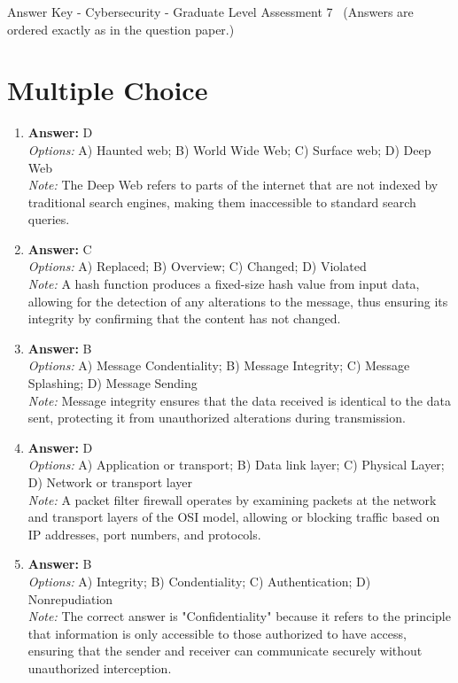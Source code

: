 \documentclass[12pt]{article}
\begin{document}
\begin{center}
Answer Key - Cybersecurity - Graduate Level Assessment 7 \
\small (Answers are ordered exactly as in the question paper.)
\end{center}

\section*{Multiple Choice}
\begin{enumerate}[label=\arabic*.]
\item \textbf{Answer:} D
\\ \textit{Options:} A) Haunted web; B) World Wide Web; C) Surface web; D) Deep Web
\\ \textit{Note:} The Deep Web refers to parts of the internet that are not indexed by traditional search engines, making them inaccessible to standard search queries.
\item \textbf{Answer:} C
\\ \textit{Options:} A) Replaced; B) Overview; C) Changed; D) Violated
\\ \textit{Note:} A hash function produces a fixed-size hash value from input data, allowing for the detection of any alterations to the message, thus ensuring its integrity by confirming that the content has not changed.
\item \textbf{Answer:} B
\\ \textit{Options:} A) Message Condentiality; B) Message Integrity; C) Message Splashing; D) Message Sending
\\ \textit{Note:} Message integrity ensures that the data received is identical to the data sent, protecting it from unauthorized alterations during transmission.
\item \textbf{Answer:} D
\\ \textit{Options:} A) Application or transport; B) Data link layer; C) Physical Layer; D) Network or transport layer
\\ \textit{Note:} A packet filter firewall operates by examining packets at the network and transport layers of the OSI model, allowing or blocking traffic based on IP addresses, port numbers, and protocols.
\item \textbf{Answer:} B
\\ \textit{Options:} A) Integrity; B) Condentiality; C) Authentication; D) Nonrepudiation
\\ \textit{Note:} The correct answer is "Confidentiality" because it refers to the principle that information is only accessible to those authorized to have access, ensuring that the sender and receiver can communicate securely without unauthorized interception.
\end{enumerate}
\end{document}
